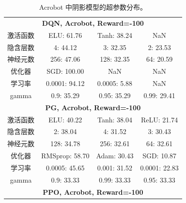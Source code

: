 \begin{table}[!ht]
    \centering
    \footnotesize
    \caption{Acrobot 中阴影模型的超参数分布。}
    \label{Acrobot-reward0100-hyperparameter-ratio}
    \begin{tabular}{cccc}
    \toprule
    \multicolumn{4}{c}{\multirow{2}{*}{\textbf{DQN, Acrobot, Reward=-100}}}  \\
    \multicolumn{4}{c}{}                                            \\ \toprule
    激活函数     & ELU: 61.76     & Tanh: 38.24   & NaN           \\
    隐含层数 & 4: 44.12       & 3: 32.35      & 2: 23.53      \\
    神经元数 & 256: 47.06     & 128: 32.35    & 64: 20.59     \\
    优化器      & SGD: 100.00    & NaN           & NaN           \\
    学习率 & 0.0001: 94.12  & 0.0005: 5.88  & NaN           \\
    gamma          & 0.9: 35.29     & 0.95: 35.29   & 0.99: 29.41   \\ \toprule
    \multicolumn{4}{c}{\multirow{2}{*}{\textbf{PG, Acrobot, Reward=-100}}}   \\
    \multicolumn{4}{c}{}                                            \\ \toprule
    激活函数     & ELU: 40.22     & Tanh: 38.04   & ReLU: 21.74   \\
    隐含层数 & 2: 38.04       & 4: 31.52      & 3: 30.43      \\
    神经元数 & 128: 34.78     & 256: 32.61    & 64: 32.61     \\
    优化器      & RMSprop: 58.70 & Adam: 30.43   & SGD: 10.87    \\
    学习率 & 0.0005: 45.65  & 0.001: 31.52  & 0.0001: 22.83 \\
    gamma          & 0.9: 33.33     & 0.99: 33.33   & 0.95: 33.33   \\ \toprule
    \multicolumn{4}{c}{\multirow{2}{*}{\textbf{PPO, Acrobot, Reward=-100}}}  \\

\end{tabular}
\end{table}
